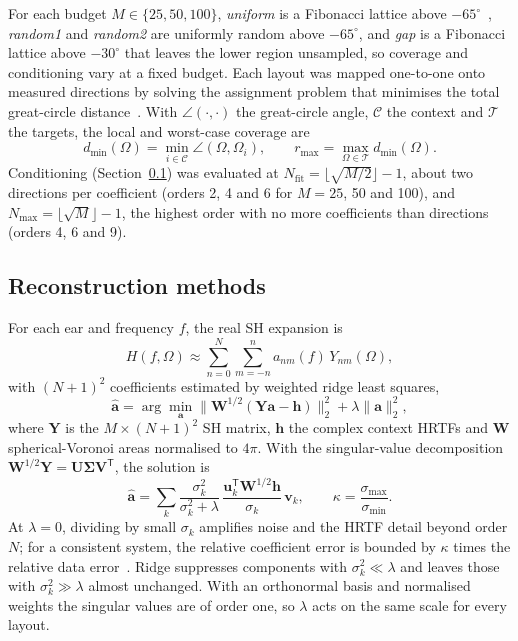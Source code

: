 \documentclass[11pt,a4paper]{article}
\newcommand{\dmin}{d_{\min}}
\newcommand{\rmax}{r_{\max}}
\begin{document}
For each budget $M\in\{25,50,100\}$, \emph{uniform} is a Fibonacci lattice above $-65^\circ$~\cite{gonzalez2010}, \emph{random1} and \emph{random2} are uniformly random above $-65^\circ$, and \emph{gap} is a Fibonacci lattice above $-30^\circ$ that leaves the lower region unsampled, so coverage and conditioning vary at a fixed budget. Each layout was mapped one-to-one onto measured directions by solving the assignment problem that minimises the total great-circle distance~\cite{kuhn1955}. With $\angle(\cdot,\cdot)$ the great-circle angle, $\mathcal C$ the context and $\mathcal T$ the targets, the local and worst-case coverage are
\begin{equation}
\dmin(\Omega)=\min_{i\in\mathcal C}\angle(\Omega,\Omega_i),\qquad \rmax=\max_{\Omega\in\mathcal T}\dmin(\Omega).
\end{equation}
Conditioning (Section~\ref{sec:sh}) was evaluated at $N_{\mathrm{fit}}=\lfloor\sqrt{M/2}\rfloor-1$, about two directions per coefficient (orders 2, 4 and 6 for $M=25$, 50 and 100), and $N_{\max}=\lfloor\sqrt M\rfloor-1$, the highest order with no more coefficients than directions (orders 4, 6 and 9).

\subsection{Reconstruction methods}
\label{sec:sh}

For each ear and frequency $f$, the real SH expansion is
\begin{equation}
H(f,\Omega)\approx\sum_{n=0}^{N}\sum_{m=-n}^{n}a_{nm}(f)\,Y_{nm}(\Omega),
\end{equation}
with $(N+1)^2$ coefficients estimated by weighted ridge least squares,
\begin{equation}
\hat{\mathbf a}=\arg\min_{\mathbf a}\big\|\mathbf W^{1/2}(\mathbf Y\mathbf a-\mathbf h)\big\|_2^2+\lambda\|\mathbf a\|_2^2,
\label{eq:ridge}
\end{equation}
where $\mathbf Y$ is the $M\times(N+1)^2$ SH matrix, $\mathbf h$ the complex context HRTFs and $\mathbf W$ spherical-Voronoi areas normalised to $4\pi$. With the singular-value decomposition $\mathbf W^{1/2}\mathbf Y=\mathbf U\boldsymbol\Sigma\mathbf V^{\mathsf T}$, the solution is
\begin{equation}
\hat{\mathbf a}=\sum_{k}\frac{\sigma_k^2}{\sigma_k^2+\lambda}\,\frac{\mathbf u_k^{\mathsf T}\mathbf W^{1/2}\mathbf h}{\sigma_k}\,\mathbf v_k,\qquad \kappa=\frac{\sigma_{\max}}{\sigma_{\min}}.
\label{eq:filter}
\end{equation}
At $\lambda=0$, dividing by small $\sigma_k$ amplifies noise and the HRTF detail beyond order $N$; for a consistent system, the relative coefficient error is bounded by $\kappa$ times the relative data error~\cite{hansen1998}. Ridge suppresses components with $\sigma_k^2\ll\lambda$ and leaves those with $\sigma_k^2\gg\lambda$ almost unchanged. With an orthonormal basis and normalised weights the singular values are of order one, so $\lambda$ acts on the same scale for every layout.
\end{document}
